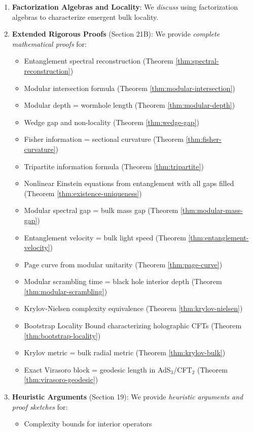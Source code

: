 \documentclass[12pt,a4paper]{article}
\begin{document}
\begin{enumerate}
    \item \textbf{Factorization Algebras and Locality}: We \textit{discuss} using factorization algebras to characterize emergent bulk locality.
    
    \item \textbf{Extended Rigorous Proofs} (Section 21B): We provide \textit{complete mathematical proofs} for:
    \begin{itemize}
        \item Entanglement spectral reconstruction (Theorem \ref{thm:spectral-reconstruction})
        \item Modular intersection formula (Theorem \ref{thm:modular-intersection})
        \item Modular depth = wormhole length (Theorem \ref{thm:modular-depth})
        \item Wedge gap and non-locality (Theorem \ref{thm:wedge-gap})
        \item Fisher information = sectional curvature (Theorem \ref{thm:fisher-curvature})
        \item Tripartite information formula (Theorem \ref{thm:tripartite})
        \item Nonlinear Einstein equations from entanglement with all gaps filled (Theorem \ref{thm:existence-uniqueness})
        \item Modular spectral gap = bulk mass gap (Theorem \ref{thm:modular-mass-gap})
        \item Entanglement velocity = bulk light speed (Theorem \ref{thm:entanglement-velocity})
        \item Page curve from modular unitarity (Theorem \ref{thm:page-curve})
        \item Modular scrambling time = black hole interior depth (Theorem \ref{thm:modular-scrambling})
        \item Krylov-Nielsen complexity equivalence (Theorem \ref{thm:krylov-nielsen})
        \item Bootstrap Locality Bound characterizing holographic CFTs (Theorem \ref{thm:bootstrap-locality})
        \item Krylov metric = bulk radial metric (Theorem \ref{thm:krylov-bulk})
        \item Exact Virasoro block = geodesic length in AdS$_3$/CFT$_2$ (Theorem \ref{thm:virasoro-geodesic})
    \end{itemize}
    
    \item \textbf{Heuristic Arguments} (Section 19): We provide \textit{heuristic arguments and proof sketches} for:
    \begin{itemize}
        \item Complexity bounds for interior operators
    \end{itemize}
    

\end{enumerate}
\end{document}
